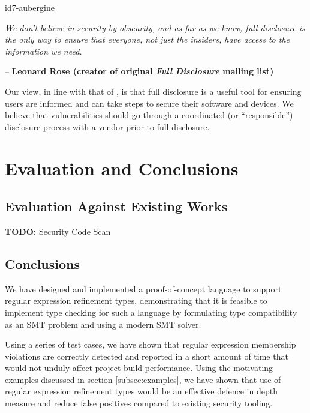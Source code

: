 \documentclass[a4paper,openany,12pt]{book}
\newcommand{\todobox}[1] {\colorbox{todocolor}{\parbox{\dimexpr \linewidth-\columnsep}{\vspace{.75\baselineskip}\centering\parbox{0.95\linewidth}{\faIcon{lightbulb} \textbf{TODO:} #1\vspace{.75\baselineskip}}}}}
\begin{document}
\begin{mdframed}
    \begin{leftbar}{id7-aubergine}
        \vspace{0.25em}

        \textit{We don't believe in security by obscurity, and as far as we know, full disclosure is the only way to ensure that everyone, not just the insiders, have access to the information we need.} \\
        \vspace{0.25em}
    \end{leftbar}
    \vspace{-0.2em}
    \hfill \textcolor{id7-aubergine}{\small \sffamily -- \textbf{Leonard Rose (creator of original \textit{Full Disclosure} mailing list)}}
    \rmfamily
\end{mdframed}

Our view, in line with that of \citeauthor{schneier2007fd}, is that full disclosure is a useful tool for ensuring users
are informed and can take steps to secure their software and devices.
We believe that vulnerabilities should go through a coordinated (or ``responsible'') disclosure process with a vendor
prior to full disclosure.

\chapter{Evaluation and Conclusions}

\section{Evaluation Against Existing Works}

\todobox{Security Code Scan}

\section{Conclusions}

We have designed and implemented a proof-of-concept language to support regular expression refinement types,
demonstrating that it is feasible to implement type checking for such a language by formulating type compatibility
as an SMT problem and using a modern SMT solver.

Using a series of test cases, we have shown that regular expression membership violations are correctly detected
and reported in a short amount of time that would not unduly affect project build performance.
Using the motivating examples discussed in section \ref{subsec:examples}, we have shown that use of regular expression
refinement types would be an effective defence in depth measure and reduce false positives compared to existing security
tooling.
\end{document}
